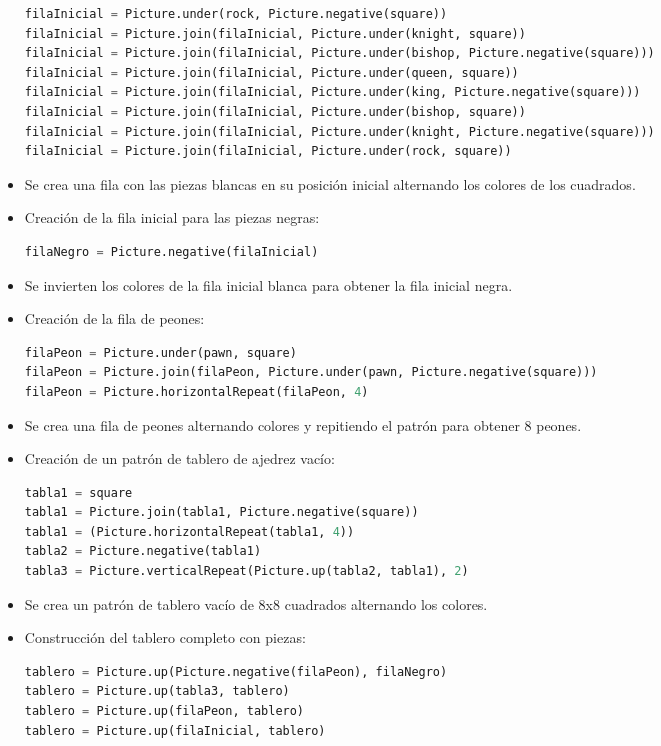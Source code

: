 \documentclass{article}
\begin{document}
\begin{itemize}
\begin{lstlisting}[language=Python, caption={Fila inicial para piezas blancas}, float=H]
filaInicial = Picture.under(rock, Picture.negative(square))
filaInicial = Picture.join(filaInicial, Picture.under(knight, square))
filaInicial = Picture.join(filaInicial, Picture.under(bishop, Picture.negative(square)))
filaInicial = Picture.join(filaInicial, Picture.under(queen, square))
filaInicial = Picture.join(filaInicial, Picture.under(king, Picture.negative(square)))
filaInicial = Picture.join(filaInicial, Picture.under(bishop, square))
filaInicial = Picture.join(filaInicial, Picture.under(knight, Picture.negative(square)))
filaInicial = Picture.join(filaInicial, Picture.under(rock, square))
         \end{lstlisting}
    \item Se crea una fila con las piezas blancas en su posición inicial alternando los colores de los cuadrados.
    \item Creación de la fila inicial para las piezas negras:
    \begin{lstlisting}[language=Python, caption={Fila inicial para piezas negras}, float=H]
                    filaNegro = Picture.negative(filaInicial)
    \end{lstlisting}
    \item Se invierten los colores de la fila inicial blanca para obtener la fila inicial negra.
    \item Creación de la fila de peones:
    \begin{lstlisting}[language=Python, caption={Fila de peones}, float=H]
filaPeon = Picture.under(pawn, square)
filaPeon = Picture.join(filaPeon, Picture.under(pawn, Picture.negative(square)))
filaPeon = Picture.horizontalRepeat(filaPeon, 4)
    \end{lstlisting}
    \item Se crea una fila de peones alternando colores y repitiendo el patrón para obtener 8 peones.
    \item Creación de un patrón de tablero de ajedrez vacío:
    \begin{lstlisting}[language=Python, caption={Patrón de tablero vacío}, float=H]
tabla1 = square
tabla1 = Picture.join(tabla1, Picture.negative(square))
tabla1 = (Picture.horizontalRepeat(tabla1, 4))
tabla2 = Picture.negative(tabla1)
tabla3 = Picture.verticalRepeat(Picture.up(tabla2, tabla1), 2)
    \end{lstlisting}
    \item Se crea un patrón de tablero vacío de 8x8 cuadrados alternando los colores.
    \item Construcción del tablero completo con piezas:
    \begin{lstlisting}[language=Python, caption={Tablero completo con piezas}, float=H]
tablero = Picture.up(Picture.negative(filaPeon), filaNegro)
tablero = Picture.up(tabla3, tablero)
tablero = Picture.up(filaPeon, tablero)
tablero = Picture.up(filaInicial, tablero)


\end{lstlisting}
\end{itemize}
\end{document}
